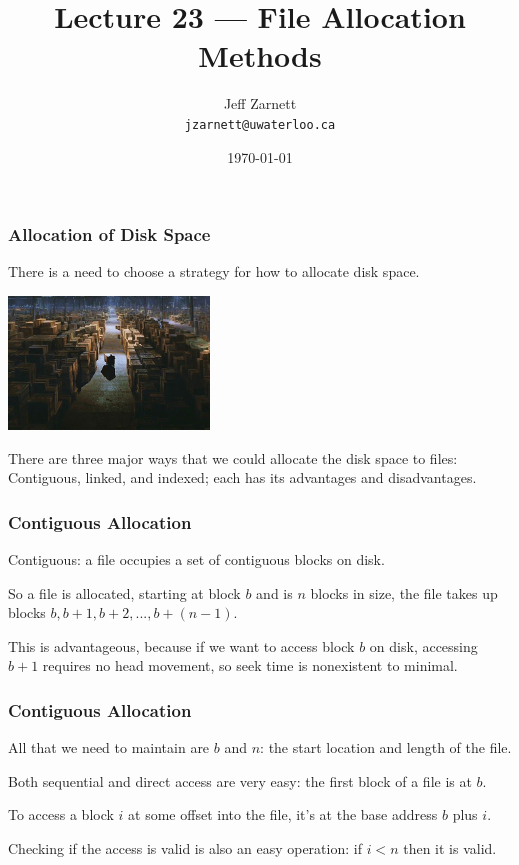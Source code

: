 

\title{Lecture 23 --- File Allocation Methods }

\author{Jeff Zarnett \\ \small \texttt{jzarnett@uwaterloo.ca}}
\date{\today}




\begin{frame}
  \titlepage

 \end{frame}


\begin{frame}
\frametitle{Allocation of Disk Space}

There is a need to choose a strategy for how to allocate disk space. 

\begin{center}
	\includegraphics[width=0.4\textwidth]{images/jones.jpg}
\end{center}

There are three major ways that we could allocate the disk space to files:\\
\quad Contiguous, linked, and indexed; each has its advantages and disadvantages.


\end{frame}

\begin{frame}
\frametitle{Contiguous Allocation}
Contiguous: a file occupies a set of contiguous blocks on disk. 

So a file is allocated, starting at block $b$ and is $n$ blocks in size, the file takes up blocks $b, b+1, b+2, ..., b+(n-1)$. 

This is advantageous, because if we want to access block $b$ on disk, accessing $b+1$ requires no head movement, so seek time is nonexistent to minimal.

\end{frame}

\begin{frame}
\frametitle{Contiguous Allocation}

All that we need to maintain are $b$ and $n$: the start location and length of the file. 

Both sequential and direct access are very easy: the first block of a file is at $b$. 

To access a block $i$ at some offset into the file, it's at the base address $b$ plus $i$. 

Checking if the access is valid is also an easy operation: if $i < n$ then it is valid.

\end{frame}

